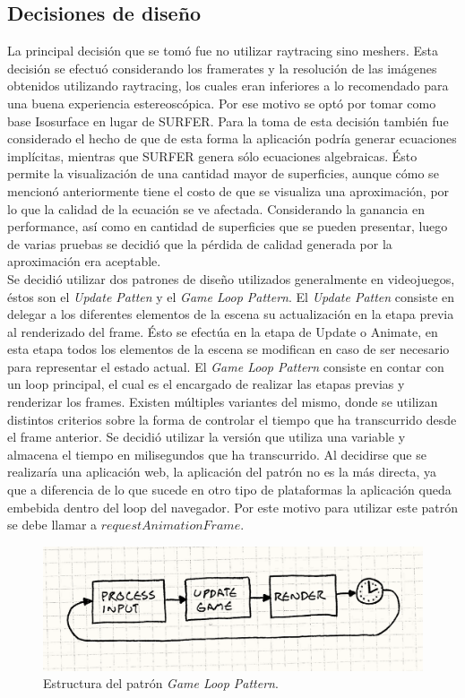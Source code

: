 \documentclass[12pt]{article}
\begin{document}
\subsection{Decisiones de diseño}
La principal decisión que se tomó fue no utilizar raytracing sino meshers. Esta decisión se efectuó considerando los framerates y la resolución de las imágenes obtenidos utilizando raytracing, los cuales eran inferiores a lo recomendado para una buena experiencia estereoscópica. Por ese motivo se optó por tomar como base Isosurface en lugar de SURFER. Para la toma de esta decisión también fue considerado el hecho de que de esta forma la aplicación podría generar ecuaciones implícitas, mientras que SURFER genera sólo ecuaciones algebraicas. Ésto permite la visualización de una cantidad mayor de superficies, aunque cómo se mencionó anteriormente tiene el costo de que se visualiza una aproximación, por lo que la calidad de la ecuación se ve afectada. Considerando la ganancia en performance, así como en cantidad de superficies que se pueden presentar, luego de varias pruebas se decidió que la pérdida de calidad generada por la aproximación era aceptable.
\\Se decidió utilizar dos patrones de diseño utilizados generalmente en videojuegos, éstos son el \textit{Update Patten} y el \textit{Game Loop Pattern}\cite{patterns}\cite{engine}. El \textit{Update Patten} consiste en delegar a los diferentes elementos de la escena su actualización en la etapa previa al renderizado del frame. Ésto se efectúa en la etapa de Update o Animate, en esta etapa todos los elementos de la escena se modifican en caso de ser necesario para representar el estado actual. El \textit{Game Loop Pattern} consiste en contar con un loop principal, el cual es el encargado de realizar las etapas previas y renderizar los frames. Existen múltiples variantes del mismo\cite{patterns}, donde se utilizan distintos criterios sobre la forma de controlar el tiempo que ha transcurrido desde el frame anterior. Se decidió utilizar la versión que utiliza una variable y almacena el tiempo en milisegundos que ha transcurrido. Al decidirse que se realizaría una aplicación web, la aplicación del patrón no es la más directa, ya que a diferencia de lo que sucede en otro tipo de plataformas la aplicación queda embebida dentro del loop del navegador. Por este motivo para utilizar este patrón se debe llamar a $requestAnimationFrame$\cite{patterns}.
\begin{figure}[h]
\includegraphics[width =0.7\linewidth, center]{gameloop.png}
\caption{Estructura del patrón \textit{Game Loop Pattern}\cite{patterns}.}
\label{ fig : surface }
\end{figure}
\end{document}
